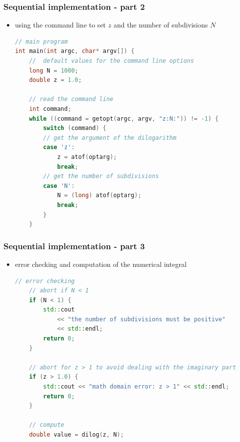 \begin{frame}[fragile]
%
  \frametitle{Sequential implementation - part 2}
%
  \begin{itemize}
  \item using the command line to set $z$ and the number of subdivisions $N$
  \begin{lstlisting}[language=c++,name=sequential]
// main program
int main(int argc, char* argv[]) {
    //  default values for the command line options
    long N = 1000;
    double z = 1.0;

    // read the command line
    int command;
    while ((command = getopt(argc, argv, "z:N:")) != -1) {
        switch (command) {
        // get the argument of the dilogarithm 
        case 'z':
            z = atof(optarg);
            break;
        // get the number of subdivisions
        case 'N':
            N = (long) atof(optarg);
            break;
        }
    }
  \end{lstlisting}
%
  \end{itemize}
%
\end{frame}

\begin{frame}[fragile]
%
  \frametitle{Sequential implementation - part 3}
%
  \begin{itemize}
  \item error checking and computation of the numerical integral
  \begin{lstlisting}[language=c++,name=sequential]
    // error checking
    // abort if N < 1
    if (N < 1) {
        std::cout 
            << "the number of subdivisions must be positive"
            << std::endl;
        return 0;
    }

    // abort for z > 1 to avoid dealing with the imaginary part
    if (z > 1.0) {
        std::cout << "math domain error: z > 1" << std::endl;
        return 0;
    } 

    // compute
    double value = dilog(z, N);
  \end{lstlisting}
%
  \end{itemize}
%
\end{frame}

